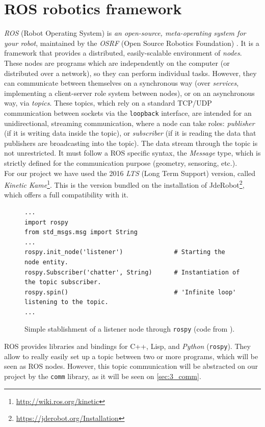 \section{ROS robotics framework}
	\label{sec:3_ros}
	\emph{ROS} (Robot Operating System) is \textit{an open-source, meta-operating system for your robot}, maintained by the \emph{OSRF} (Open Source Robotics Foundation) \cite{ros-intro}. It is a framework that provides a distributed, easily-scalable environment of \emph{nodes}. These nodes are programs which are independently on the computer (or distributed over a network), so they can perform individual tasks. However, they can communicate between themselves on a synchronous way (over \emph{services}, implementing a client-server role system between nodes), or on an asynchronous way, via \textit{topics}. These topics, which rely on a standard TCP/UDP communication between sockets via the \texttt{loopback} interface, are intended for an unidirectional, streaming communication, where a node can take roles: \emph{publisher} (if it is writing data inside the topic), or \emph{subscriber} (if it is reading the data that publishers are broadcasting into the topic). The data stream through the topic is not unrestricted. It must follow a ROS specific syntax, the \emph{Message} type, which is strictly defined for the communication purpose (geometry, sensoring, etc.).\\
	
	For our project we have used the 2016 \textit{LTS} (Long Term Support) version, called \textit{Kinetic Kame}\footnote{\url{http://wiki.ros.org/kinetic}}. This is the version bundled on the installation of JdeRobot\footnote{\url{https://jderobot.org/Installation}}, which offers a full compatibility with it.\\
	

	\begin{figure}[h]
		\begin{lstlisting}
...
import rospy
from std_msgs.msg import String
...
rospy.init_node('listener')              # Starting the node entity.
rospy.Subscriber('chatter', String)      # Instantiation of the topic subscriber.
rospy.spin()                             # 'Infinite loop' listening to the topic.
...
		\end{lstlisting}
		\caption{Simple stablishment of a listener node through \texttt{rospy} (code from \cite{listener-rospy}).}
		\label{fig:3_rospy_listener}
	\end{figure}
	
	ROS provides libraries and bindings for C++, Lisp, and \textit{Python} (\texttt{rospy}). They allow to really easily set up a topic between two or more programs, which will be seen as ROS nodes. However, this topic communication will be abstracted on our project by the \texttt{comm} library, as it will be seen on \autoref{sec:3_comm}.\\
	
